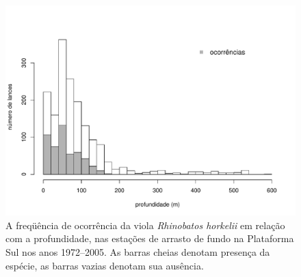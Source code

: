 \documentclass[a4paper,11pt,twoside,showtrims,onecolumn,openright,final]{memoir}
\begin{document}
\begin{figure}
\begin{center}
\includegraphics[width=\textwidth]{VIOLA_DISTRIBPROF}
\end{center}
\caption[A freqüência de ocorrência da viola \emph{Rhinobatos horkelii} 
	em relação com a profundidade, nas estações de arrasto de 
	fundo na Plataforma Sul nos anos 1972--2005]
	{A freqüência de ocorrência da viola \emph{Rhinobatos horkelii} 
	em relação com a profundidade, nas estações de arrasto de 
	fundo na Plataforma Sul nos anos 1972--2005. 
	As barras cheias denotam presença da espécie, 
	as barras vazias denotam sua ausência.}
\label{fig:fo-viola-profundidade}
\end{figure}


%
%
\end{document}

